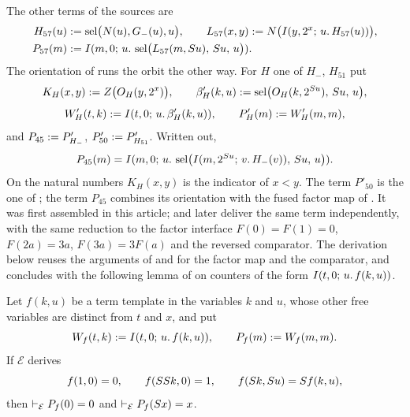 The other terms of the sources are
\begin{align*}
 H_{57}(u)&\mathrel{:=}\operatorname{sel}\bigl(N(u),G_-(u),u\bigr),\qquad
 L_{57}(x,y)\mathrel{:=} N\bigl(I(y,2^{x};\,u.\,H_{57}(u))\bigr),\\
 P_{57}(m)&\mathrel{:=}I(m,0;\,u.\,\operatorname{sel}\bigl(L_{57}(m,S u),\,S u,\,u\bigr)).
\end{align*}
The orientation of  runs the orbit the other way.  For $H$ one
of $H_-$, $H_{51}$ put
\[
 K_H(x,y)\mathrel{:=} Z\bigl(O_H(y,2^{x})\bigr),\qquad
 \beta'_H(k,u)\mathrel{:=}\operatorname{sel}\bigl(O_H(k,2^{S u}),\,S u,\,u\bigr),
\]
\[
 W'_H(t,k)\mathrel{:=}I(t,0;\,u.\,\beta'_H(k,u)),\qquad P'_H(m)\mathrel{:=} W'_H(m,m),
\]
and $P_{45}\mathrel{:=} P'_{H_-}$, $P'_{50}\mathrel{:=} P'_{H_{51}}$.  Written out,
\[
 P_{45}(m)=I(m,0;\,u.\,\operatorname{sel}\bigl(I(m,2^{S u};\,v.\,H_-(v)),\,S u,\,u\bigr)).
\]
On the natural numbers $K_H(x,y)$ is the indicator of $x<y$.  The term
$P'_{50}$ is the one of ; the term $P_{45}$ combines its
orientation with the fused factor map of .  It was
first assembled in this article;  and
 later deliver the same term independently, with the
same reduction to the factor interface $F(0)=F(1)=0$, $F(2a)=3a$,
$F(3a)=3F(a)$ and the reversed comparator.  The derivation below reuses the
arguments of  and  for the factor map and
the comparator, and concludes with the following lemma of
 on counters of the form $I(t,0;\,u.\,f(k,u))$.

\begin{lemma}
\label{base:lem:diag}
Let $f(k,u)$ be a term template in the variables $k$ and $u$, whose other
free variables are distinct from $t$ and $x$, and put
\[
 W_f(t,k)\mathrel{:=}I(t,0;\,u.\,f(k,u)),\qquad P_f(m)\mathrel{:=} W_f(m,m).
\]
If $\mathcal E$ derives
\[
 f(1,0)=0,\qquad f(SS k,0)=1,\qquad f(S k,S u)=S f(k,u),
\]
then $\vdash_{\mathcal E}P_f(0)=0$ and $\vdash_{\mathcal E}P_f(S x)=x$.
\end{lemma}

